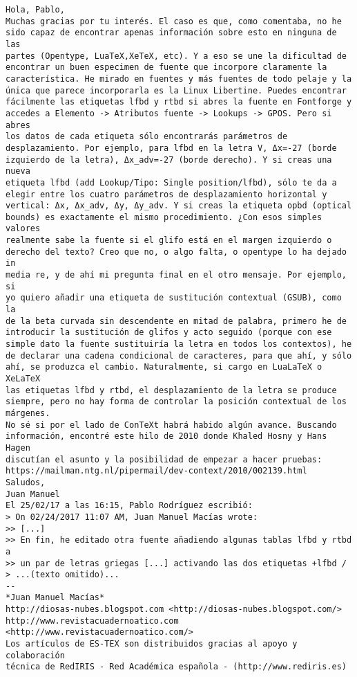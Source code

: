 \documentclass[a4paper,10pt]{article}
\begin{document}
\begin{lstlisting}
Hola, Pablo,
Muchas gracias por tu interés. El caso es que, como comentaba, no he 
sido capaz de encontrar apenas información sobre esto en ninguna de las 
partes (Opentype, LuaTeX,XeTeX, etc). Y a eso se une la dificultad de 
encontrar un buen especimen de fuente que incorpore claramente la 
característica. He mirado en fuentes y más fuentes de todo pelaje y la 
única que parece incorporarla es la Linux Libertine. Puedes encontrar 
fácilmente las etiquetas lfbd y rtbd si abres la fuente en Fontforge y 
accedes a Elemento -> Atributos fuente -> Lookups -> GPOS. Pero si abres 
los datos de cada etiqueta sólo encontrarás parámetros de 
desplazamiento. Por ejemplo, para lfbd en la letra V, Δx=-27 (borde 
izquierdo de la letra), Δx_adv=-27 (borde derecho). Y si creas una nueva 
etiqueta lfbd (add Lookup/Tipo: Single position/lfbd), sólo te da a 
elegir entre los cuatro parámetros de desplazamiento horizontal y 
vertical: Δx, Δx_adv, Δy, Δy_adv. Y si creas la etiqueta opbd (optical 
bounds) es exactamente el mismo procedimiento. ¿Con esos simples valores 
realmente sabe la fuente si el glifo está en el margen izquierdo o 
derecho del texto? Creo que no, o algo falta, o opentype lo ha dejado in 
media re, y de ahí mi pregunta final en el otro mensaje. Por ejemplo, si 
yo quiero añadir una etiqueta de sustitución contextual (GSUB), como la 
de la beta curvada sin descendente en mitad de palabra, primero he de 
introducir la sustitución de glifos y acto seguido (porque con ese 
simple dato la fuente sustituiría la letra en todos los contextos), he 
de declarar una cadena condicional de caracteres, para que ahí, y sólo 
ahí, se produzca el cambio. Naturalmente, si cargo en LuaLaTeX o XeLaTeX 
las etiquetas lfbd y rtbd, el desplazamiento de la letra se produce 
siempre, pero no hay forma de controlar la posición contextual de los 
márgenes.
No sé si por el lado de ConTeXt habrá habido algún avance. Buscando 
información, encontré este hilo de 2010 donde Khaled Hosny y Hans Hagen 
discutían el asunto y la posibilidad de empezar a hacer pruebas: 
https://mailman.ntg.nl/pipermail/dev-context/2010/002139.html
Saludos,
Juan Manuel
El 25/02/17 a las 16:15, Pablo Rodríguez escribió:
> On 02/24/2017 11:07 AM, Juan Manuel Macías wrote:
>> [...]
>> En fin, he editado otra fuente añadiendo algunas tablas lfbd y rtbd a
>> un par de letras griegas [...] activando las dos etiquetas +lfbd /
> ...(texto omitido)...
-- 
*Juan Manuel Macías*
http://diosas-nubes.blogspot.com <http://diosas-nubes.blogspot.com/>
http://www.revistacuadernoatico.com <http://www.revistacuadernoatico.com/>
Los artículos de ES-TEX son distribuidos gracias al apoyo y colaboración 
técnica de RedIRIS - Red Académica española - (http://www.rediris.es)

\end{lstlisting}
\end{document}
